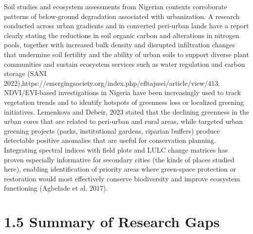 Soil studies and ecosystem assessments from Nigerian contexts corroborate patterns of below-ground degradation associated with urbanization. A research conducted across urban gradients and in converted peri-urban lands have a report clearly stating the reductions in soil organic carbon and alterations in nitrogen pools, together with increased bulk density and disrupted infiltration changes that undermine soil fertility and the ability of urban soils to support diverse plant communities and sustain ecosystem services such as water regulation and carbon storage (SANI 2022),https://emergingsociety.org/index.php/efltajssei/article/view/413. NDVI/EVI-based investigations in Nigeria have been increasingly used to track vegetation trends and to identify hotspots of greenness loss or localized greening initiatives. Lemenkova and Debeir, 2023 stated that the declining greenness in the urban cores that are related to peri-urban and rural areas, while targeted urban greening projects (parks, institutional gardens, riparian buffers) produce detectable positive anomalies that are useful for conservation planning. Integrating spectral indices with field plots and LULC change matrices has proven especially informative for secondary cities (the kinds of places studied here), enabling identification of priority areas where green-space protection or restoration would most effectively conserve biodiversity and improve ecosystem functioning (Agbelade et al. 2017).
\hypertarget{summary-of-research-gaps}{%
\section{\texorpdfstring{\textbf{1.5 Summary of Research Gaps}}{1.5 Summary of Research Gaps}}\label{summary-of-research-gaps}}


